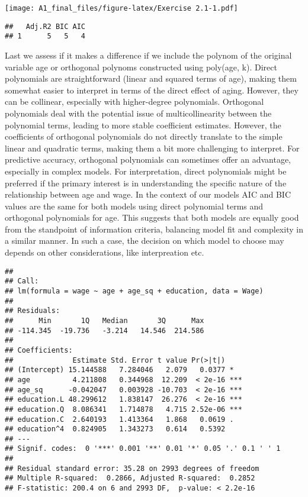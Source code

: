 \documentclass[
]{article}
\begin{document}
\texttt{[image: A1\_final\_files/figure-latex/Exercise 2.1-1.pdf]}

\begin{verbatim}
##   Adj.R2 BIC AIC
## 1      5   5   4
\end{verbatim}

Last we assess if it makes a difference if we include the polynom of the
original variable age or orthogonal polynoms constructed using poly(age,
k). Direct polynomials are straightforward (linear and squared terms of
age), making them somewhat easier to interpret in terms of the direct
effect of aging. However, they can be collinear, especially with
higher-degree polynomials. Orthogonal polynomials deal with the
potential issue of multicollinearity between the polynomial terms,
leading to more stable coefficient estimates. However, the coefficients
of orthogonal polynomials do not directly translate to the simple linear
and quadratic terms, making them a bit more challenging to interpret.
For predictive accuracy, orthogonal polynomials can sometimes offer an
advantage, especially in complex models. For interpretation, direct
polynomials might be preferred if the primary interest is in
understanding the specific nature of the relationship between age and
wage. In the context of our models AIC and BIC values are the same for
both models using direct polynomial terms and orthogonal polynomials for
age. This suggests that both models are equally good from the standpoint
of information criteria, balancing model fit and complexity in a similar
manner. In such a case, the decision on which model to choose may
depends on other considerations, like interpreation etc.

\begin{verbatim}
## 
## Call:
## lm(formula = wage ~ age + age_sq + education, data = Wage)
## 
## Residuals:
##      Min       1Q   Median       3Q      Max 
## -114.345  -19.736   -3.214   14.546  214.586 
## 
## Coefficients:
##              Estimate Std. Error t value Pr(>|t|)    
## (Intercept) 15.144588   7.284046   2.079   0.0377 *  
## age          4.211808   0.344968  12.209  < 2e-16 ***
## age_sq      -0.042047   0.003928 -10.703  < 2e-16 ***
## education.L 48.299612   1.838147  26.276  < 2e-16 ***
## education.Q  8.086341   1.714878   4.715 2.52e-06 ***
## education.C  2.640193   1.413364   1.868   0.0619 .  
## education^4  0.824905   1.343273   0.614   0.5392    
## ---
## Signif. codes:  0 '***' 0.001 '**' 0.01 '*' 0.05 '.' 0.1 ' ' 1
## 
## Residual standard error: 35.28 on 2993 degrees of freedom
## Multiple R-squared:  0.2866, Adjusted R-squared:  0.2852 
## F-statistic: 200.4 on 6 and 2993 DF,  p-value: < 2.2e-16
\end{verbatim}
\end{document}
